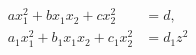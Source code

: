 \begin{proposition}\label{eq:030}
\[
    \begin{aligned}ax_1^2+bx_1x_2+cx_2^2&=d,\\a_1x_1^2+b_1x_1x_2+c_1x_2^2&=d_1z^2\end{aligned}
\]
\end{proposition}
